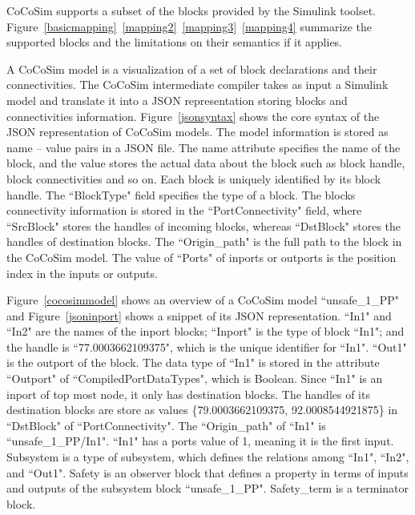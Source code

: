 \documentclass{article}
\begin{document}
CoCoSim supports a subset of the blocks provided by the Simulink toolset. Figure~\ref{basicmapping}~\ref{mapping2}~\ref{mapping3}~\ref{mapping4} summarize the supported blocks and the limitations on their semantics if it applies. 

A CoCoSim model is a visualization of a set of block declarations and their connectivities.
The CoCoSim intermediate compiler takes as input a Simulink model and translate it into a JSON representation storing blocks and connectivities information. 
Figure~\ref{jsonsyntax} shows the core syntax of the JSON representation of CoCoSim models.
The model information is stored as name -- value pairs in a JSON file. 
The name attribute specifies the name of the block, and the value stores the actual data about the block such as block handle, block connectivities and so on. 
Each block is uniquely identified by its block handle.
The \textsf{``BlockType"} field specifies the type of a block. 
The blocks connectivity information is stored in the \textsf{``PortConnectivity"} field, where \textsf{``SrcBlock"} stores the handles of incoming blocks, whereas \textsf{``DstBlock"} stores the handles of destination blocks. 
The \textsf{``Origin\_path"} is the full path to the block in the CoCoSim model.
The value of \textsf{``Ports"} of inports or outports is the position index in the inputs or outputs. 

Figure~\ref{cocosimmodel} shows an overview of a CoCoSim model ``unsafe\_1\_PP" and Figure~\ref{jsoninport} shows a snippet of its JSON representation. 
\textsf{``In1"} and \textsf{``In2"} are the names of the inport blocks; \textsf{``Inport"} is the type of block \textsf{``In1"}; and the handle is \textsf{``77.0003662109375"}, which is the unique identifier for \textsf{``In1"}. 
\textsf{``Out1"} is the outport of the block.
The data type of \textsf{``In1"} is stored in the attribute \textsf{``Outport"} of \textsf{``CompiledPortDataTypes"}, which is Boolean. 
Since \textsf{``In1"} is an inport of top most node, it only has destination blocks. 
The handles of its destination blocks are store as values \textsf{\{79.0003662109375, 92.0008544921875\}} in \textsf{``DstBlock"} of \textsf{``PortConnectivity"}. 
The \textsf{``Origin\_path"} of \textsf{``In1"} is \textsf{``unsafe\_1\_PP/In1"}.
\textsf{``In1"} has a ports value of 1, meaning it is the first input. 
Subsystem is a type of subsystem, which defines the relations among \textsf{``In1", ``In2"}, and \textsf{``Out1"}. 
Safety is an observer block that defines a property in terms of inputs and outputs of the subsystem block ``unsafe\_1\_PP". 
Safety\_term is a terminator block.
\end{document}
